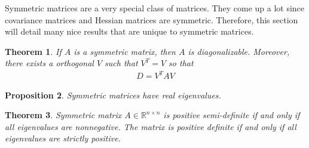 \documentclass[12pt]{article}
\numberwithin{equation}{section} %
\theoremstyle{plain}
\newtheorem{thm}{Theorem}[section]
\newtheorem{prop}[thm]{Proposition}
\theoremstyle{definition}
\theoremstyle{remark}
\newcommand{\Rnn}{\mathbb{R}^{n\times n}}
\begin{document}
Symmetric matrices are a very special class of matrices. They come up a
lot since covariance matrices and Hessian matrices are symmetric.
Therefore, this section will detail many nice results that are unique to
symmetric matrices.

\begin{thm}
\label{thm:symmetric-diag}
If $A$ is a symmetric matrix, then $A$ is diagonalizable. Moreover,
there exists a orthogonal $V$ such that $V^T = V$ so that
\begin{align*}
  D = V^T A V
\end{align*}
\end{thm}

\begin{prop}
Symmetric matrices have \emph{real} eigenvalues.
\end{prop}

\begin{thm}
\label{thm:possemidef-eigenval}
Symmetric matrix $A\in\Rnn$ is positive semi-definite if and only if all
eigenvalues are nonnegative. The matrix is positive definite if and only
if all eigenvalues are strictly positive.
\end{thm}
\end{document}
